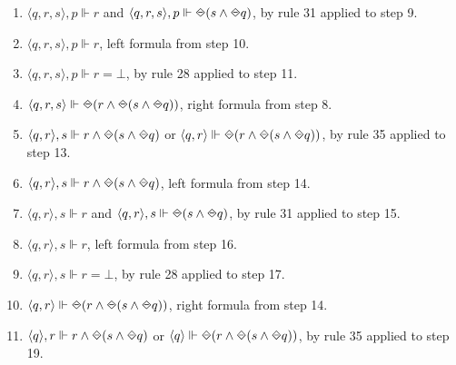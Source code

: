 \begin{myEx}
\begin{enumerate}
\item $\langle q, r, s \rangle, p \Vdash r$ and $\langle q, r, s \rangle, p \Vdash \LTLonce(s \land \LTLonce q)$, by rule 31 applied to step 9.\\ %

\item $\langle q, r, s \rangle, p \Vdash r$, left formula from step 10.\\ %

\item $\langle q, r, s \rangle, p \Vdash r = \bot$, by rule 28 applied to step 11.\\ %

\item $\langle q, r, s \rangle \Vdash \LTLonce(r \land \LTLonce(s \land \LTLonce q))$, right formula from step 8.\\ %

\item $\langle q, r \rangle, s \Vdash r \land \LTLonce(s \land \LTLonce q)$ or $\langle q, r \rangle \Vdash \LTLonce(r \land \LTLonce(s \land \LTLonce q))$, by rule 35 applied to step 13.\\ %

\item $\langle q, r \rangle, s \Vdash r \land \LTLonce(s \land \LTLonce q)$, left formula from step 14.\\ %

\item $\langle q, r \rangle, s \Vdash r$ and $\langle q, r \rangle, s \Vdash \LTLonce(s \land \LTLonce q)$, by rule 31 applied to step 15.\\ %

\item $\langle q, r \rangle, s \Vdash r$, left formula from step 16.\\ %

\item $\langle q, r \rangle, s \Vdash r = \bot$, by rule 28 applied to step 17.\\ %

\item $\langle q, r \rangle \Vdash \LTLonce(r \land \LTLonce(s \land \LTLonce q))$, right formula from step 14.\\ %

\item $\langle q \rangle, r \Vdash r \land \LTLonce(s \land \LTLonce q)$ or $\langle q \rangle \Vdash \LTLonce(r \land \LTLonce(s \land \LTLonce q))$, by rule 35 applied to step 19.\\ %


\end{enumerate}
\end{myEx}
